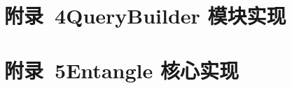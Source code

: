 \newpage

\section*{附录~4\quad	QueryBuilder 模块实现}



\newpage

\section*{附录~5\quad	Entangle 核心实现}



